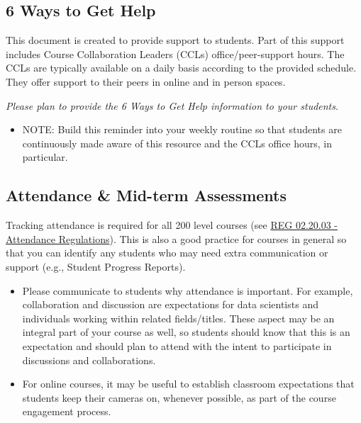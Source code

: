 \documentclass[
]{book}
\providecommand{\tightlist}{%
  \setlength{\itemsep}{0pt}\setlength{\parskip}{0pt}}
\begin{document}
\hypertarget{ways-to-get-help}{%
\subsection{6 Ways to Get Help}\label{ways-to-get-help}}

This document is created to provide support to students. Part of this support includes Course Collaboration Leaders (CCLs) office/peer-support hours. The CCLs are typically available on a daily basis according to the provided schedule. They offer support to their peers in online and in person spaces.

{ \emph{Please plan to provide the 6 Ways to Get Help information to your students}. }

\begin{itemize}
\tightlist
\item
  NOTE: Build this reminder into your weekly routine so that students are continuously made aware of this resource and the CCLs office hours, in particular.
\end{itemize}

\hypertarget{attendance-mid-term-assessments}{%
\subsection{Attendance \& Mid-term Assessments}\label{attendance-mid-term-assessments}}

Tracking attendance is required for all 200 level courses (see \href{https://policies.ncsu.edu/regulation/reg-02-20-03-attendance-regulations/}{REG 02.20.03 - Attendance Regulations}). This is also a good practice for courses in general so that you can identify any students who may need extra communication or support (e.g., Student Progress Reports).

\begin{itemize}
\item
  Please communicate to students why attendance is important. For example, collaboration and discussion are expectations for data scientists and individuals working within related fields/titles. These aspect may be an integral part of your course as well, so students should know that this is an expectation and should plan to attend with the intent to participate in discussions and collaborations.
\item
  For online courses, it may be useful to establish classroom expectations that students keep their cameras on, whenever possible, as part of the course engagement process.
\end{itemize}
\end{document}
